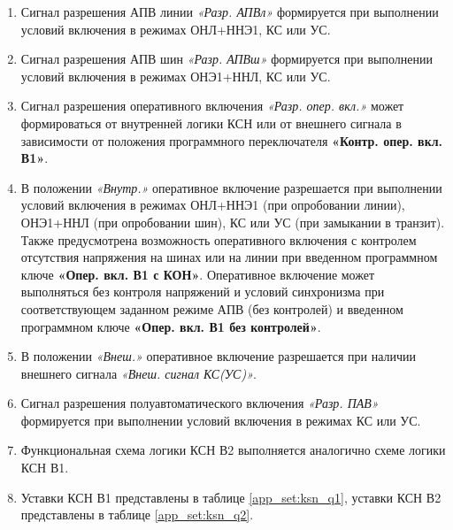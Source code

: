 \begin{enumerate}
\item
Сигнал разрешения АПВ линии \textit{«Разр. АПВл»} формируется при выполнении условий включения в режимах ОНЛ+ННЭ1, КС или УС.

\item
Сигнал разрешения АПВ шин \textit{«Разр. АПВш»} формируется при выполнении условий включения в режимах ОНЭ1+ННЛ, КС или УС. 

\item
Сигнал разрешения оперативного включения \textit{«Разр. опер. вкл.»} может формироваться от внутренней логики КСН или от внешнего сигнала в зависимости от положения программного переключателя \textbf{«Контр. опер. вкл. В1»}.

\item
В положении \textit{«Внутр.»} оперативное включение разрешается при выполнении условий включения в режимах ОНЛ+ННЭ1 (при опробовании линии), ОНЭ1+ННЛ (при опробовании шин), КС или УС (при замыкании в транзит). Также предусмотрена возможность оперативного включения с контролем отсутствия напряжения на шинах или на линии при введенном программном ключе \textbf{«Опер. вкл. В1 с КОН»}. Оперативное включение может выполняться без контроля напряжений и условий синхронизма при соответствующем заданном режиме АПВ (без контролей) и введенном программном ключе \textbf{«Опер. вкл. В1 без контролей»}.

\item
В положении \textit{«Внеш.»} оперативное включение разрешается при наличии внешнего сигнала \textit{«Внеш. сигнал КС(УС)»}.

\item
Сигнал разрешения полуавтоматического включения \textit{«Разр. ПАВ»} формируется при выполнении условий включения в режимах КС или УС.

\item
Функциональная схема логики КСН В2 выполняется аналогично схеме логики КСН В1. 

\item
Уставки КСН В1 представлены в таблице \ref{app_set:ksn_q1}, уставки КСН В2 представлены в таблице \ref{app_set:ksn_q2}.

\end{enumerate}